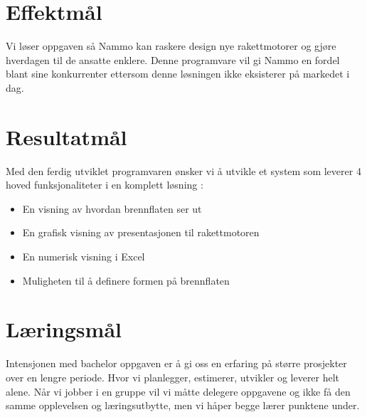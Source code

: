 \section{Effektmål}
Vi løser oppgaven så Nammo kan raskere design nye rakettmotorer og gjøre hverdagen til de ansatte enklere. Denne programvare vil gi Nammo en fordel blant sine konkurrenter ettersom denne løsningen ikke eksisterer på markedet i dag.

\section{Resultatmål}
Med den ferdig utviklet programvaren ønsker vi å utvikle et system som leverer 4 hoved funksjonaliteter i en komplett løsning :
\begin{itemize}
    \item En visning av hvordan brennflaten ser ut
    \item En grafisk visning av presentasjonen til rakettmotoren
    \item En numerisk visning i Excel
    \item Muligheten til å definere formen på brennflaten
\end{itemize}
	
	


\section{Læringsmål}
Intensjonen med bachelor oppgaven er å gi oss en erfaring på større prosjekter over en lengre periode. Hvor vi planlegger, estimerer, utvikler og leverer helt alene. Når vi jobber i en gruppe vil vi måtte delegere oppgavene og ikke få den samme opplevelsen og læringsutbytte, men vi håper begge lærer punktene under.


